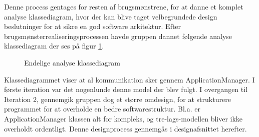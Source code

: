 Denne process gentages for resten af brugsmønstrene, for at danne et komplet analyse klassediagram, hvor der kan blive taget velbegrundede design beslutninger for at sikre en god software arkitektur. Efter brugsmønsterrealiseringsprocessen havde gruppen dannet følgende analyse klassediagram der ses på figur \ref{fig:AnalyseKlasseDiagramV3}.

\begin{figure}
{}
    \caption{Endelige analyse klassediagram}
    \label{fig:AnalyseKlasseDiagramV3}
\end{figure}

Klassediagrammet viser at al kommunikation sker gennem ApplicationManager. I første iteration var det nogenlunde denne model der blev fulgt. I overgangen til Iteration 2, gennemgik gruppen dog et større omdesign, for at strukturere programmet for at overholde en bedre softwarestruktur. Bl.a. er ApplicationManager klassen alt for kompleks, og tre-lags-modellen bliver ikke overholdt ordentligt. Denne designprocess gennemgås i designafsnittet herefter. 




